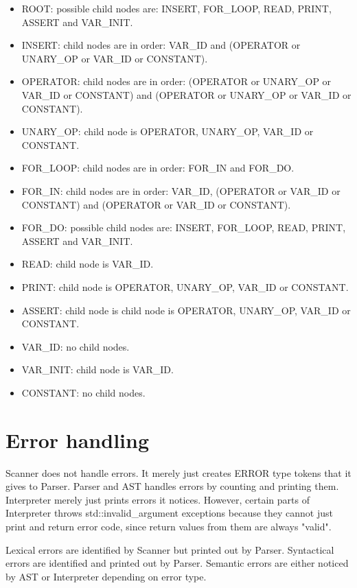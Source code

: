 \documentclass[english,11pt,twoside,a4paper]{article}
\begin{document}
\begin{itemize}
	\item ROOT: possible child nodes are: INSERT, FOR\_LOOP, READ, PRINT, ASSERT and VAR\_INIT.
	\item INSERT: child nodes are in order: VAR\_ID and (OPERATOR or UNARY\_OP or VAR\_ID or CONSTANT).
	\item OPERATOR: child nodes are in order: (OPERATOR or UNARY\_OP or VAR\_ID or CONSTANT) and (OPERATOR or UNARY\_OP or VAR\_ID or CONSTANT).
	\item UNARY\_OP: child node is OPERATOR, UNARY\_OP, VAR\_ID or CONSTANT.
    \item FOR\_LOOP: child nodes are in order: FOR\_IN and FOR\_DO.
    \item FOR\_IN: child nodes are in order: VAR\_ID, (OPERATOR or VAR\_ID or CONSTANT) and (OPERATOR or VAR\_ID or CONSTANT).
    \item FOR\_DO: possible child nodes are: INSERT, FOR\_LOOP, READ, PRINT, ASSERT and VAR\_INIT.
    \item READ: child node is VAR\_ID.
    \item PRINT: child node is OPERATOR, UNARY\_OP, VAR\_ID or CONSTANT.
    \item ASSERT: child node is child node is OPERATOR, UNARY\_OP, VAR\_ID or CONSTANT.
    \item VAR\_ID: no child nodes.
    \item VAR\_INIT: child node is VAR\_ID.
    \item CONSTANT: no child nodes.
\end{itemize}

\section{Error handling}

Scanner does not handle errors. It merely just creates ERROR type tokens that it gives to Parser. Parser and AST handles errors by counting and printing them. Interpreter merely just prints errors it notices. However, certain parts of Interpreter throws std::invalid\_argument exceptions because they cannot just print and return error code, since return values from them are always "valid".

Lexical errors are identified by Scanner but printed out by Parser. Syntactical errors are identified and printed out by Parser. Semantic errors are either noticed by AST or Interpreter depending on error type. 
\end{document}
